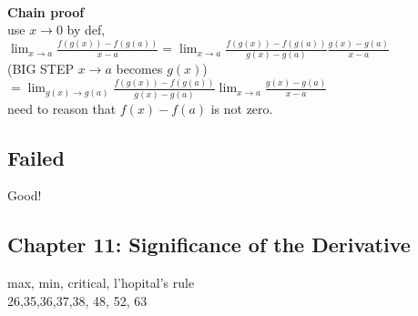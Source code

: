 \documentclass[a4paper, 12pt]{article}
\begin{document}
\ \\
\medskip

\noindent \textbf{Chain proof}\\
\textcolor[gray]{0.5}{use $x \rightarrow 0$ by def, 
$\lim_{x \rightarrow a} \frac{f(g(x)) - f(g(a))}{x - a} = \lim_{x \rightarrow a} \frac{f(g(x)) - f(g(a))}{g(x) - g(a)} \frac{g(x) - g(a)}{x-a}$\\
(BIG STEP $x \rightarrow a$ becomes $g(x)$)\\ 
$= \lim_{g(x) \rightarrow g(a)} \frac{f(g(x)) - f(g(a))}{g(x) - g(a)} \lim_{x \rightarrow a} \frac{g(x) - g(a)}{x-a}$}\\
need to reason that $f(x) - f(a)$ is not zero.

\subsection*{Failed}
Good!





\subsection*{Chapter 11: Significance of the Derivative}
max, min, critical, l'hopital's rule\\
26,35,36,37,38, 48, 52, 63\\
\end{document}
